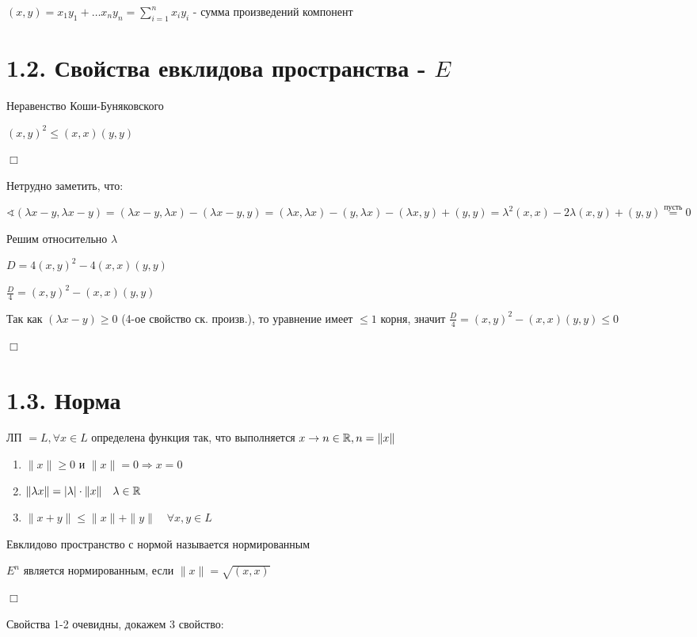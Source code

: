 \documentclass[12pt]{article}
\begin{document}
    $(x, y) = x_1 y_1 + \dots x_n y_n = \sum_{i=1}^n x_i y_i$ - сумма произведений компонент

    \section{1.2. Свойства евклидова пространства - $E$}

    \Th Неравенство Коши-Буняковского

    $(x, y)^2 \leq (x, x)(y, y)$

    $\Box$

    Нетрудно заметить, что:

    $\sphericalangle (\lambda x - y, \lambda x - y) = (\lambda x - y, \lambda x) - (\lambda x - y, y) =
    (\lambda x, \lambda x) - (y, \lambda x) - (\lambda x, y) + (y, y) = \lambda^2 (x, x) - 2\lambda (x, y) + (y, y) \stackrel{\text{пусть}}{=} 0$

    Решим относительно $\lambda$

    $D = 4(x, y)^2 - 4(x, x)(y, y)$

    $\frac{D}{4} = (x, y)^2 - (x, x)(y, y)$

    Так как $(\lambda x - y) \geq 0$ (4-ое свойство ск. произв.), то уравнение имеет $\leq 1$ корня, значит
    $\frac{D}{4} = (x, y)^2 - (x, x)(y, y) \leq 0$

    $\Box$

    \section{1.3. Норма}

    ЛП $= L, \forall x \in L$ определена функция так, что выполняется $x \to n \in \mathbb{R}, n = \|x\|$

    \begin{enumerate}
        \item $\|x\| \geq 0$ и $\|x\| = 0 \Longrightarrow x = 0$
        \item $\|\lambda x\| = |\lambda| \cdot \|x\| \quad \lambda \in \mathbb{R}$
        \item $\|x + y\| \leq \|x\| + \|y\| \quad \forall x, y \in L$
    \end{enumerate}

    Евклидово пространство с нормой называется нормированным

    \Th $E^n$ является нормированным, если $\|x\| = \sqrt{(x, x)}$

    $\Box$

    Свойства 1-2 очевидны, докажем 3 свойство:
\end{document}
